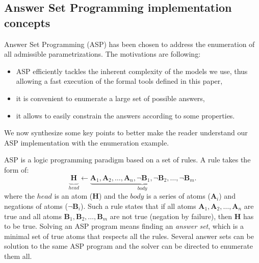 \subsection{Answer Set Programming implementation concepts}



\newcommand{\ti}[1]{\texttt{\textit{#1}}}
\newcommand{\aspil}[1]{\texttt{#1}}
\newcommand{\asp}[1]{\begin{itemize} \item[] \aspil{#1} \end{itemize}}

\newcommand{\atom}{\mathbf}
\newcommand{\la}{\leftarrow}
\newcommand{\var}[1]{#1}
\newcommand{\nota}{\neg}

\newcommand{\paramlabel}{\atom{param\_label}}
\newcommand{\paramres}{\atom{param\_resource}}

Answer Set Programming (ASP) \cite{Baral03} has been chosen to address the enumeration of all admissible parametrizations.
The motivations are following:
\begin{itemize}
  \item ASP efficiently tackles the inherent complexity of the models we use, thus allowing a fast execution of the formal tools defined in this paper,
  \item it is convenient to enumerate a large set of possible answers,
  \item it allows to easily constrain the answers according to some properties.
\end{itemize}
We now synthesize some key points to better make the reader understand our ASP implementation with the enumeration example.

ASP is a logic programming paradigm based on a set of rules.
A rule takes the form of:
$$\underbrace{{\ }\atom{H}_{\ }}_{head} \la \underbrace{\atom{A}_1, \atom{A}_2, \dots, \atom{A}_n, \nota \atom{B}_1, \nota \atom{B}_2, \dots, \nota \atom{B}_m}_{body}.$$
where the $head$ is an atom ($\atom{H}$) and the $body$ is a series of atoms ($\atom{A}_i$) and negations of atoms ($\nota \atom{B}_i$).
Such a rule states that if all atoms $\atom{A}_1, \atom{A}_2, \dots, \atom{A}_n$ are true
and all atoms $\atom{B}_1, \atom{B}_2, \dots, \atom{B}_m$ are not true (negation by failure), then $\atom{H}$ has to be true.
Solving an ASP program means finding an \emph{answer set}, which is a minimal set of true atoms that respects all the rules.
Several answer sets can be solution to the same ASP program and the solver can be directed to enumerate them all.


